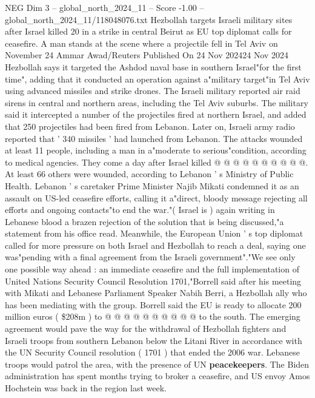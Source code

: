 \begin{textsample}{NEG Dim 3 – global\_north\_2024\_11 – Score -1.00 – global\_north\_2024\_11/118048076.txt}  \label{ex:f3_neg_284}
Hezbollah targets Israeli military sites after Israel killed 20 in a strike in central Beirut as EU top diplomat calls for ceasefire.
A man stands at the scene where a projectile fell in Tel Aviv on November 24 Ammar Awad/Reuters Published On 24 Nov 202424 Nov 2024 Hezbollah says it targeted the Ashdod naval base in southern Israel"for the first time", adding that it conducted an operation against a"military target"in Tel Aviv using advanced missiles and strike drones.
The Israeli military reported air raid sirens in central and northern areas, including the Tel Aviv suburbs.
The military said it intercepted a number of the projectiles fired at northern Israel, and added that 250 projectiles had been fired from Lebanon.
Later on, Israeli army radio reported that ' 340 missiles ' had launched from Lebanon.
The attacks wounded at least 11 people, including a man in a"moderate to serious"condition, according to medical agencies.
They come a day after Israel killed @ @ @ @ @ @ @ @ @ @.
At least 66 others were wounded, according to Lebanon ' s Ministry of Public Health.
Lebanon ' s caretaker Prime Minister Najib Mikati condemned it as an assault on US-led ceasefire efforts, calling it a"direct, bloody message rejecting all efforts and ongoing contacts"to end the war."( Israel is ) again writing in Lebanese blood a brazen rejection of the solution that is being discussed,"a statement from his office read.
Meanwhile, the European Union ' s top diplomat called for more pressure on both Israel and Hezbollah to reach a deal, saying one was"pending with a final agreement from the Israeli government"."We see only one possible way ahead : an immediate ceasefire and the full implementation of United Nations Security Council Resolution 1701,"Borrell said after his meeting with Mikati and Lebanese Parliament Speaker Nabih Berri, a Hezbollah ally who has been mediating with the group.
Borrell said the EU is ready to allocate 200 million euros ( \$208m ) to @ @ @ @ @ @ @ @ @ @ to the south.
The emerging agreement would pave the way for the withdrawal of Hezbollah fighters and Israeli troops from southern Lebanon below the Litani River in accordance with the UN Security Council resolution ( 1701 ) that ended the 2006 war.
Lebanese troops would patrol the area, with the presence of UN \textbf{peacekeepers}.
The Biden administration has spent months trying to broker a ceasefire, and US envoy Amos Hochstein was back in the region last week.

\end{textsample}
